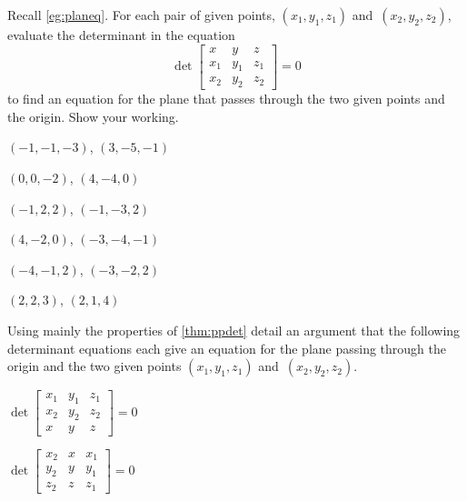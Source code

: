 \begin{exercise} \label{ex:} 
Recall \autoref{eg:planeq}.
For each pair of given points, \((x_1,y_1,z_1)\) and~\((x_2,y_2,z_2)\), evaluate the determinant in the equation
\begin{equation*}
\det\begin{bmatrix} x&y&z\\x_1&y_1&z_1\\x_2&y_2&z_2 \end{bmatrix}=0
\end{equation*}
to find an equation for the plane that passes through the two given points and the origin.
Show your working.
\begin{parts}
\item \((-1,-1,-3)\), \((3,-5,-1)\)

\item \((0,0,-2)\), \((4,-4,0)\)

\item \((-1,2,2)\), \((-1,-3,2)\)

\item \((4,-2,0)\), \((-3,-4,-1)\)

\item \((-4,-1,2)\), \((-3,-2,2)\)

\item \((2,2,3)\), \((2,1,4)\)

\end{parts}
\end{exercise}




\begin{exercise} \label{ex:} 
Using mainly the properties of \autoref{thm:ppdet} detail an argument that the following determinant equations each give an equation for the plane passing through the origin and the two given points \((x_1,y_1,z_1)\) and~\((x_2,y_2,z_2)\).
\begin{parts}
\item \(\det\begin{bmatrix} x_1&y_1&z_1
\\x_2&y_2&z_2
\\x&y&z \end{bmatrix}=0\)

\item \(\det\begin{bmatrix} x_2&x&x_1
\\y_2&y&y_1
\\z_2&z&z_1 \end{bmatrix}=0\)

\end{parts}
\end{exercise}








